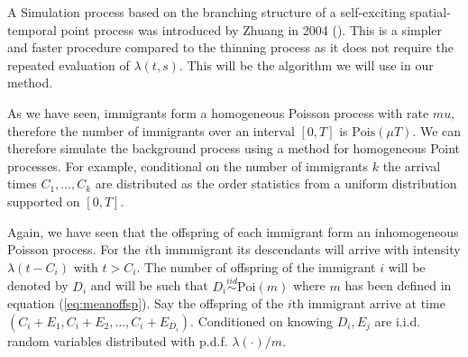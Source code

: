 \documentclass[11pt,a4paper]{article}
\begin{document}
A Simulation process based on the branching structure of a self-exciting spatial-temporal point process was introduced by Zhuang in 2004 (\cite{Zhuang}). This is a simpler and faster procedure compared to the thinning process as it does not require the repeated evaluation of $\lambda(t, s)$. This will be the algorithm we will use in our method.

As we have seen, immigrants form a homogeneous Poisson process with rate $mu$, therefore the number of immigrants over an interval $[0, T]$ is $\text{Pois}(\mu T)$. We can therefore simulate the background process using a method for homogeneous Point processes. For example, conditional on the number of immigrants $k$ the arrival times $C_1, \dots, C_k$ are distributed as the order statistics from a uniform distribution supported on $[0, T]$.

Again, we have seen that the offspring of each immigrant form an inhomogeneous Poisson process. For the $i$th immmigrant its descendants will arrive with intensity $\lambda(t-C_i)$ with $t > C_i$. The number of offspring of the immigrant $i$ will be denoted by $D_i$ and will be such that $D_i \overset{iid}{\sim}\text{Poi}(m)$ where $m$ has been defined in equation (\ref{eq:meanoffsp}). Say the offspring of the $i$th immigrant arrive at time $(C_i + E_1, C_i + E_2, \dots, C_i + E_{D_i})$. Conditioned on knowing $D_i, E_j$ are i.i.d. random variables distributed with p.d.f. $\lambda(\cdot)/m$.
\end{document}
